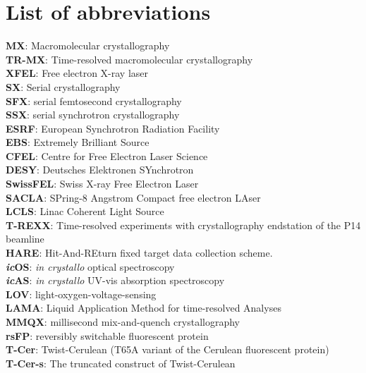 \documentclass{report}
\begin{document}
\pagebreak
\tableofcontents 
\pagebreak

\section*{List of abbreviations}

\noindent \textbf{MX}: Macromolecular crystallography\\
\textbf{TR-MX}: Time-resolved macromolecular crystallography\\
\textbf{XFEL}: Free electron X-ray laser\\
\textbf{SX}: Serial crystallography\\
\textbf{SFX}: serial femtosecond crystallography\\
\textbf{SSX}: serial synchrotron crystallography\\
\textbf{ESRF}: European Synchrotron Radiation Facility\\
\textbf{EBS}: Extremely Brilliant Source\\
\textbf{CFEL}: Centre for Free Electron Laser Science\\
\textbf{DESY}: Deutsches Elektronen SYnchrotron\\
\textbf{SwissFEL}: Swiss X-ray Free Electron Laser\\
\textbf{SACLA}: SPring-8 Angstrom Compact free electron LAser\\
\textbf{LCLS}:  Linac Coherent Light Source\\
\textbf{T-REXX}: Time-resolved experiments with crystallography endstation of the P14 beamline\\
\textbf{HARE}: Hit-And-REturn fixed target data collection scheme. \\
\textbf{\textit{ic}OS}: \textit{in crystallo} optical spectroscopy\\
\textbf{\textit{ic}AS}: \textit{in crystallo} UV-vis absorption spectroscopy\\
\textbf{LOV}:  light-oxygen-voltage-sensing\\
\textbf{LAMA}: Liquid Application Method for time-resolved Analyses\\
\textbf{MMQX}: millisecond mix-and-quench crystallography\\
\textbf{rsFP}: reversibly switchable fluorescent protein\\
\textbf{T-Cer}: Twist-Cerulean (T65A variant of the Cerulean fluorescent protein)\\
\textbf{T-Cer-s}: The truncated construct of Twist-Cerulean \\
\end{document}
